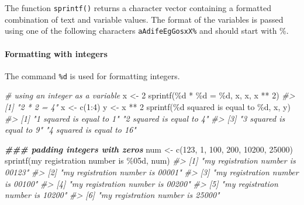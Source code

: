 \documentclass[
]{book}
\newenvironment{Shaded}{\begin{snugshade}}{\end{snugshade}}
\newcommand{\CommentTok}[1]{\textcolor[rgb]{0.56,0.35,0.01}{\textit{#1}}}
\newcommand{\DecValTok}[1]{\textcolor[rgb]{0.00,0.00,0.81}{#1}}
\newcommand{\DocumentationTok}[1]{\textcolor[rgb]{0.56,0.35,0.01}{\textbf{\textit{#1}}}}
\newcommand{\FunctionTok}[1]{\textcolor[rgb]{0.00,0.00,0.00}{#1}}
\newcommand{\NormalTok}[1]{#1}
\newcommand{\OtherTok}[1]{\textcolor[rgb]{0.56,0.35,0.01}{#1}}
\newcommand{\SpecialCharTok}[1]{\textcolor[rgb]{0.00,0.00,0.00}{#1}}
\newcommand{\StringTok}[1]{\textcolor[rgb]{0.31,0.60,0.02}{#1}}
\begin{document}
The function \texttt{sprintf()} returns a character vector containing a formatted combination of text and variable values.
The format of the variables is passed using one of the following characters \texttt{aAdifeEgGosxX\%} and should start with \%.

\hypertarget{formatting-with-integers}{%
\paragraph{Formatting with integers}\label{formatting-with-integers}}

The command \texttt{\%d} is used for formatting integers.

\begin{Shaded}
\begin{Highlighting}[]
\CommentTok{\# using an integer as a variable}
\NormalTok{x }\OtherTok{\textless{}{-}} \DecValTok{2}
\FunctionTok{sprintf}\NormalTok{(}\StringTok{\textquotesingle{}\%d * \%d = \%d\textquotesingle{}}\NormalTok{, x, x, x }\SpecialCharTok{**} \DecValTok{2}\NormalTok{)}
\CommentTok{\#\textgreater{} [1] "2 * 2 = 4"}
\NormalTok{x }\OtherTok{\textless{}{-}} \FunctionTok{c}\NormalTok{(}\DecValTok{1}\SpecialCharTok{:}\DecValTok{4}\NormalTok{)}
\NormalTok{y }\OtherTok{\textless{}{-}}\NormalTok{ x }\SpecialCharTok{**} \DecValTok{2}
\FunctionTok{sprintf}\NormalTok{(}\StringTok{\textquotesingle{}\%d squared is equal to \%d\textquotesingle{}}\NormalTok{, x, y)}
\CommentTok{\#\textgreater{} [1] "1 squared is equal to 1"  "2 squared is equal to 4" }
\CommentTok{\#\textgreater{} [3] "3 squared is equal to 9"  "4 squared is equal to 16"}

\DocumentationTok{\#\#\# padding integers with zeros}
\NormalTok{num }\OtherTok{\textless{}{-}} \FunctionTok{c}\NormalTok{(}\DecValTok{123}\NormalTok{, }\DecValTok{1}\NormalTok{, }\DecValTok{100}\NormalTok{, }\DecValTok{200}\NormalTok{, }\DecValTok{10200}\NormalTok{, }\DecValTok{25000}\NormalTok{)}
\FunctionTok{sprintf}\NormalTok{(}\StringTok{\textquotesingle{}my registration number is \%05d\textquotesingle{}}\NormalTok{, num)}
\CommentTok{\#\textgreater{} [1] "my registration number is 00123"}
\CommentTok{\#\textgreater{} [2] "my registration number is 00001"}
\CommentTok{\#\textgreater{} [3] "my registration number is 00100"}
\CommentTok{\#\textgreater{} [4] "my registration number is 00200"}
\CommentTok{\#\textgreater{} [5] "my registration number is 10200"}
\CommentTok{\#\textgreater{} [6] "my registration number is 25000"}
\end{Highlighting}
\end{Shaded}
\end{document}
